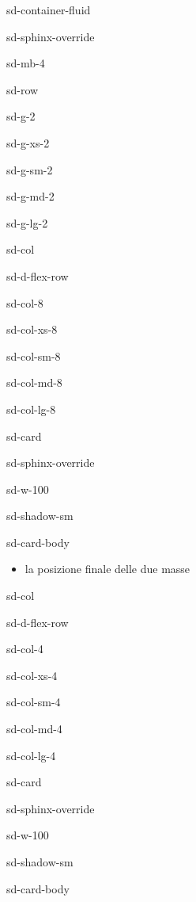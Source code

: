 \documentclass[letterpaper,10pt,italian]{jupyterBook}
\begin{document}
\begin{sphinxuseclass}{sd-container-fluid}
\begin{sphinxuseclass}{sd-sphinx-override}
\begin{sphinxuseclass}{sd-mb-4}
\begin{sphinxuseclass}{sd-row}
\begin{sphinxuseclass}{sd-g-2}
\begin{sphinxuseclass}{sd-g-xs-2}
\begin{sphinxuseclass}{sd-g-sm-2}
\begin{sphinxuseclass}{sd-g-md-2}
\begin{sphinxuseclass}{sd-g-lg-2}
\begin{sphinxuseclass}{sd-col}
\begin{sphinxuseclass}{sd-d-flex-row}
\begin{sphinxuseclass}{sd-col-8}
\begin{sphinxuseclass}{sd-col-xs-8}
\begin{sphinxuseclass}{sd-col-sm-8}
\begin{sphinxuseclass}{sd-col-md-8}
\begin{sphinxuseclass}{sd-col-lg-8}
\begin{sphinxuseclass}{sd-card}
\begin{sphinxuseclass}{sd-sphinx-override}
\begin{sphinxuseclass}{sd-w-100}
\begin{sphinxuseclass}{sd-shadow-sm}
\begin{sphinxuseclass}{sd-card-body}
\begin{itemize}
\begin{itemize}
\item {} 
\sphinxAtStartPar
la posizione finale delle due masse

\end{itemize}

\end{itemize}

\end{sphinxuseclass}
\end{sphinxuseclass}
\end{sphinxuseclass}
\end{sphinxuseclass}
\end{sphinxuseclass}
\end{sphinxuseclass}
\end{sphinxuseclass}
\end{sphinxuseclass}
\end{sphinxuseclass}
\end{sphinxuseclass}
\end{sphinxuseclass}
\end{sphinxuseclass}
\begin{sphinxuseclass}{sd-col}
\begin{sphinxuseclass}{sd-d-flex-row}
\begin{sphinxuseclass}{sd-col-4}
\begin{sphinxuseclass}{sd-col-xs-4}
\begin{sphinxuseclass}{sd-col-sm-4}
\begin{sphinxuseclass}{sd-col-md-4}
\begin{sphinxuseclass}{sd-col-lg-4}
\begin{sphinxuseclass}{sd-card}
\begin{sphinxuseclass}{sd-sphinx-override}
\begin{sphinxuseclass}{sd-w-100}
\begin{sphinxuseclass}{sd-shadow-sm}
\begin{sphinxuseclass}{sd-card-body}
\sphinxAtStartPar
{}




\end{sphinxuseclass}
\end{sphinxuseclass}
\end{sphinxuseclass}
\end{sphinxuseclass}
\end{sphinxuseclass}
\end{sphinxuseclass}
\end{sphinxuseclass}
\end{sphinxuseclass}
\end{sphinxuseclass}
\end{sphinxuseclass}
\end{sphinxuseclass}
\end{sphinxuseclass}
\end{sphinxuseclass}
\end{sphinxuseclass}
\end{sphinxuseclass}
\end{sphinxuseclass}
\end{sphinxuseclass}
\end{sphinxuseclass}
\end{sphinxuseclass}
\end{sphinxuseclass}
\end{sphinxuseclass}
\end{document}
